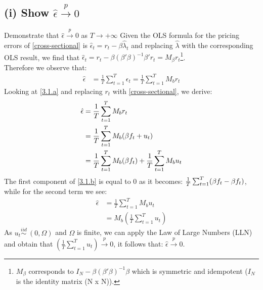 \documentclass[]{article}
\begin{document}
\subsection*{(i) Show $\hat{\epsilon} \xrightarrow{p} 0$}
Demonstrate that $\hat{\epsilon} \overset{p}{\to} 0$ as $T\to{+\infty}$ 
Given the OLS formula for the pricing errors of \ref{cross-sectional} is $\hat{\epsilon}_t = r_t - \beta\hat{\lambda}_t$ and replacing $\hat{\lambda}$ with the corresponding OLS result, we find that $\hat{\epsilon}_t = r_t - \beta(\beta'\beta)^{-1}\beta'r_t = M_{\beta}r_t$\footnote{$M_{\beta}$ corresponds to $I_N - \beta(\beta'\beta)^{-1}\beta$ which is symmetric and idempotent ($I_N$ is the identity matrix (N x N)).}.\\
Therefore we observe that:
\begin{align} \label{3.1.a}
	\hat{\epsilon} &= \frac{1}{T}\sum_{t=1}^{T}\epsilon_t = \frac{1}{T}\sum_{t=1}^{T}M_br_t
\end{align}
Looking at \ref{3.1.a} and replacing $r_t$ with \ref{cross-sectional}, we derive:
\begin{align} \label{3.1.b}
	\hat{\epsilon} &=\frac{1}{T}\sum_{t=1}^{T}M_br_t \notag \\ \notag
	&= \frac{1}{T}\sum_{t=1}^{T}M_b(\MakeUppercase\beta f_t + u_t) \\ 
	&= \frac{1}{T}\sum_{t=1}^{T}M_b(\MakeUppercase\beta f_t) + \frac{1}{T}\sum_{t=1}^{T}M_bu_t
\end{align}
The first component of \ref{3.1.b} is equal to 0 as it becomes: $\frac{1}{T}\sum_{t=1}^{T}(\MakeUppercase\beta f_t-\MakeUppercase\beta f_t)$, while for the second term we see:
\begin{align*} 
	\hat{\epsilon} &=\frac{1}{T}\sum_{t=1}^{T}M_bu_t \\
	&= M_b(\frac{1}{T}\sum_{t=1}^{T}u_t)
\end{align*}
As $u_t \overset{iid}{\sim} \: (0,\Omega)$ and $\Omega$ is finite, we can apply the Law of Large Numbers (LLN) and obtain that $(\frac{1}{T}\sum_{t=1}^{T}u_t) \overset{p}{\to} 0$, it follows that: $\hat{\epsilon} \overset{p}{\to} 0$.
\end{document}
